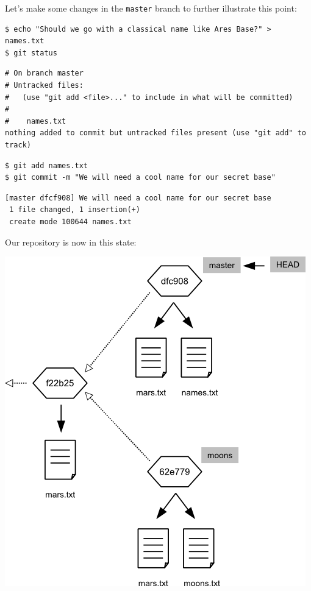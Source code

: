 \documentclass[]{book}
\begin{document}
Let's make some changes in the \texttt{master} branch to further
illustrate this point:

\begin{verbatim}
$ echo "Should we go with a classical name like Ares Base?" > names.txt
$ git status
\end{verbatim}

\begin{verbatim}
# On branch master
# Untracked files:
#   (use "git add <file>..." to include in what will be committed)
#
#    names.txt
nothing added to commit but untracked files present (use "git add" to track)
\end{verbatim}

\begin{verbatim}
$ git add names.txt
$ git commit -m "We will need a cool name for our secret base"
\end{verbatim}

\begin{verbatim}
[master dfcf908] We will need a cool name for our secret base
 1 file changed, 1 insertion(+)
 create mode 100644 names.txt
\end{verbatim}

Our repository is now in this state:

\includegraphics{novice/extras/img/git-branching-05.png}
\end{document}
